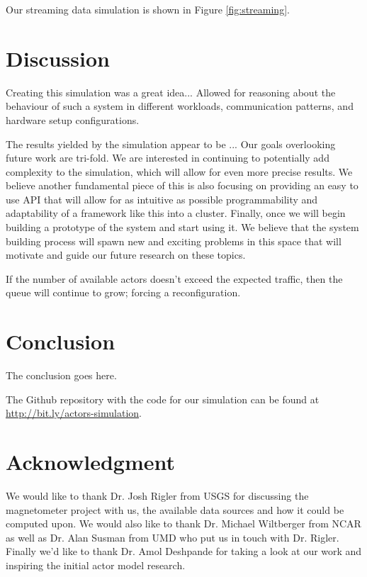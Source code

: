 \documentclass[conference,twocolumn,10pt]{IEEEtran}
\begin{document}
Our streaming data simulation is shown in Figure \ref{fig:streaming}.


\section{Discussion}

Creating this simulation was a great idea...
Allowed for reasoning about the behaviour of such a system in different workloads, communication patterns, and hardware setup configurations.

The results yielded by the simulation appear to be ...
Our goals overlooking future work are tri-fold. We are interested in continuing to potentially add complexity to the simulation, which will allow for even more precise results. We believe another fundamental piece of this is also focusing on providing an easy to use API that will allow for as intuitive as possible programmability and adaptability of a framework like this into a cluster. Finally, once we will begin building a prototype of the system and start using it.  We believe that the system building process will spawn new and exciting problems in this space that will motivate and guide our future research on these topics.

If the number of available actors doesn't exceed the expected traffic, then the queue will continue to grow; forcing a reconfiguration.

\section{Conclusion}
The conclusion goes here.


The Github repository with the code for our simulation can be found at \url{http://bit.ly/actors-simulation}.



\section*{Acknowledgment}
We would like to thank Dr. Josh Rigler from USGS for discussing the magnetometer project with us, the available data sources and how it could be computed upon. We would also like to thank Dr. Michael Wiltberger from NCAR as well as Dr. Alan Susman from UMD who put us in touch with Dr. Rigler. Finally we'd like to thank Dr. Amol Deshpande for taking a look at our work and inspiring the initial actor model research.






\end{document}
